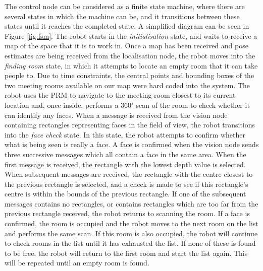 \documentclass[conference]{IEEEtran}
\begin{document}
The control node can be considered as a finite state machine, where there are several states in which the machine can be, and it transitions between these states until it reaches the completed state. A simplified diagram can be seen in Figure \ref{fig:fsm}. The robot starts in the \emph{initialisation} state, and waits to receive a map of the space that it is to work in. Once a map has been received and pose estimates are being received from the localisation node, the robot moves into the \emph{finding room} state, in which it attempts to locate an empty room that it can take people to. Due to time constraints, the central points and bounding boxes of the two meeting rooms available on our map were hard coded into the system. The robot uses the PRM to navigate to the meeting room closest to its current location and, once inside, performs a 360$^\circ$ scan of the room to check whether it can identify any faces. When a message is received from the vision node containing rectangles representing faces in the field of view, the robot transitions into the \emph{face check} state. In this state, the robot attempts to confirm whether what is being seen is really a face. A face is confirmed when the vision node sends three successive messages which all contain a face in the same area. When the first message is received, the rectangle with the lowest depth value is selected. When subsequent messages are received, the rectangle with the centre closest to the previous rectangle is selected, and a check is made to see if this rectangle's centre is within the bounds of the previous rectangle. If one of the subsequent messages contains no rectangles, or contains rectangles which are too far from the previous rectangle received, the robot returns to scanning the room. If a face is confirmed, the room is occupied and the robot moves to the next room on the list and performs the same scan. If this room is also occupied, the robot will continue to check rooms in the list until it has exhausted the list. If none of these is found to be free, the robot will return to the first room and start the list again. This will be repeated until an empty room is found.
\end{document}
